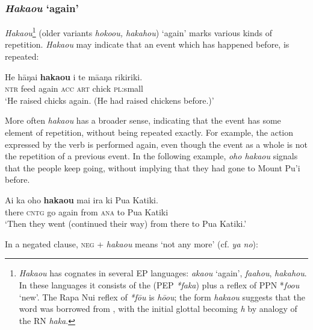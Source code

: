 \subsubsection{\textit{Haka{\ꞌ}ou} ‘again’}\label{sec:4.5.3.4}
\textit{Haka{\ꞌ}ou}\footnote{\label{fn:199}\textit{Haka{\ꞌ}ou} has cognates in several EP languages:  \textit{{\ꞌ}aka{\ꞌ}ou} ‘again’,  \textit{fa{\ꞌ}ahou},  \textit{hakahou}. In these languages it consists of the   (PEP \textit{*faka}) plus a reflex of PPN *\textit{fo{\ꞌ}ou} ‘new’. The Rapa Nui reflex of \textit{*fōu} is \textit{hō{\ꞌ}ou}; the form \textit{haka{\ꞌ}ou} suggests that the word was borrowed from , with the initial glottal becoming \textit{h} by analogy of the RN   \textit{haka}.} (older variants \textit{hoko{\ꞌ}ou, hakahou}) ‘again’ marks various kinds of repetition. \textit{Haka{\ꞌ}ou} may indicate that an event which has happened before, is repeated:

\ea\label{ex:4.141}
\gll He hāŋai \textbf{haka{\ꞌ}ou} i te mā{\ꞌ}aŋa rikiriki. \\
\textsc{ntr} feed again \textsc{acc} \textsc{art} chick \textsc{pl}:small \\

\glt
‘He raised chicks again. (He had raised chickens before.)’ \textstyleExampleref{[Mtx-7-05.021]}
\z

More often \textit{haka{\ꞌ}ou} has a broader sense, indicating that the event has some element of repetition, without being repeated exactly. For example, the action expressed by the verb is performed again, even though the event as a whole is not the repetition of a previous event. In the following example, \textit{oho haka{\ꞌ}ou} signals that the people keep going, without implying that they had gone to Mount Pu’i before.

\ea\label{ex:4.142}
\gll {\ꞌ}Ai ka oho \textbf{haka{\ꞌ}ou} mai ira ki Pua Katiki. \\
there \textsc{cntg} go again from \textsc{ana} to Pua Katiki \\

\glt
‘Then they went (continued their way) from there to Pua Katiki.’ \textstyleExampleref{[R420.047]} 
\z

In a negated clause, \textsc{neg} + \textit{haka{\ꞌ}ou} means ‘not any more’ (cf.  \textit{ya no}):

